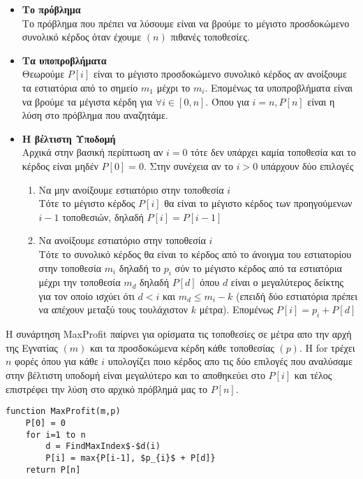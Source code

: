 \documentclass[a4paper]{article}
\begin{document}
\begin{itemize}
\item\textbf{Το πρόβλημα}\\
Το πρόβλημα που πρέπει να λύσουμε είναι να βρούμε το μέγιστο προσδοκώμενο συνολικό κέρδος όταν έχουμε $(n)$ πιθανές τοποθεσίες.
\item\textbf{Τα υποπροβλήματα}\\
Θεωρούμε $P[i]$ είναι το μέγιστο προσδοκώμενο συνολικό κέρδος αν ανοίξουμε τα εστιατόρια από το σημείο $m_{1}$ μέχρι το $m_{i}$. Επομένως τα υποπροβλήματα είναι να βρούμε τα μέγιστα κέρδη για $\forall i \in [0,n]$. Όπου για $i = n, P[n]$ είναι η λύση στο πρόβλημα που αναζητάμε.
\item\textbf{Η βέλτιστη Υποδομή}\\
Αρχικά στην βασική περίπτωση αν $i = 0$ τότε δεν υπάρχει καμία τοποθεσία και το κέρδος είναι μηδέν $P[0] = 0$.
Στην συνέχεια αν το $i>0$ υπάρχουν δύο επιλογές
\begin{enumerate}
\item Να μην ανοίξουμε εστιατόριο στην τοποθεσία $i$\\
Τότε το μέγιστο κέρδος $P[i]$ θα είναι το μέγιστο κέρδος των προηγούμενων $i-1$ τοποθεσιών, δηλαδή $P[i]=P[i-1]$
\item Να ανοίξουμε εστιατόριο στην τοποθεσία $i$\\
Τότε το συνολικό κέρδος θα είναι το κέρδος από το άνοιγμα του εστιατορίου στην τοποθεσία $m_{i}$ δηλαδή το  $p_{i}$ σύν το μέγιστο κέρδος από τα εστιατόρια μέχρι την τοποθεσία $m_{d}$ δηλαδή $P[d]$ όπου $d$ είναι ο μεγαλύτερος δείκτης για τον οποίο ισχύει ότι $d<i$ και $m_{d} \leq m_{i}-k$ (επειδή δύο εστιατόρια πρέπει να απέχουν μεταξύ τους τουλάχιστον $k$ μέτρα).
Επομένως $P[i] = p_{i} + P[d]$
\end{enumerate}
\end{itemize}

Η συνάρτηση MaxProfit παίρνει για ορίσματα τις τοποθεσίες σε μέτρα απο την αρχή της Εγνατίας $(m)$ και τα προσδοκώμενα κέρδη κάθε τοποθεσίας $(p)$. Η for τρέχει $n$ φορές όπου για κάθε $i$ υπολογίζει ποιο κέρδος απο τις δύο επιλογές που αναλύσαμε στην βέλτιστη υποδομή είναι μεγαλύτερο και το αποθηκεύει στο $P[i]$  και τέλος επιστρέφει την λύση στο αρχικό πρόβλημά μας το $P[n]$.

\begin{lstlisting}[mathescape]
function MaxProfit(m,p)
	P[0] = 0
	for i=1 to n
		d = FindMaxIndex$-$d(i)
		P[i] = max{P[i-1], $p_{i}$ + P[d]}
	return P[n]
\end{lstlisting}
\end{document}
